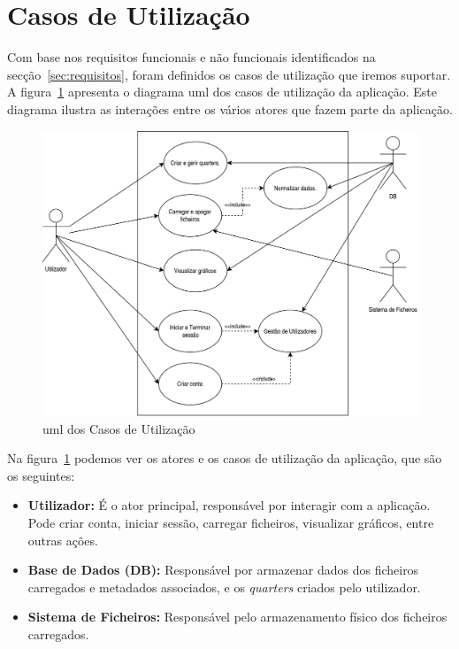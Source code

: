 \section{Casos de Utilização}
\label{ch:casosUtilizacao}

Com base nos requisitos funcionais e não funcionais identificados na secção~\ref{sec:requisitos}, foram definidos os casos de utilização que iremos suportar. A figura~\ref{fig:umlCasosUtilizacao} apresenta o diagrama \gls{uml} dos casos de utilização da aplicação. Este diagrama ilustra as interações entre os vários atores que fazem parte da aplicação.

\begin{figure}[h]
\centering
\includegraphics[max width=12cm]{./img/usecase_uml}
\caption{\gls{uml} dos Casos de Utilização}
\label{fig:umlCasosUtilizacao}
\end{figure}

Na figura~\ref{fig:umlCasosUtilizacao} podemos ver os atores e os casos de utilização da aplicação, que são os seguintes:
\begin{itemize}
    \item \textbf{Utilizador:} É o ator principal, responsável por interagir com a aplicação. Pode criar conta, iniciar sessão, carregar ficheiros, visualizar gráficos, entre outras ações.
    \item \textbf{Base de Dados (DB):} Responsável por armazenar dados dos ficheiros carregados e metadados associados, e os \textit{quarters} criados pelo utilizador.
    \item \textbf{Sistema de Ficheiros:} Responsável pelo armazenamento físico dos ficheiros carregados.
\end{itemize}



